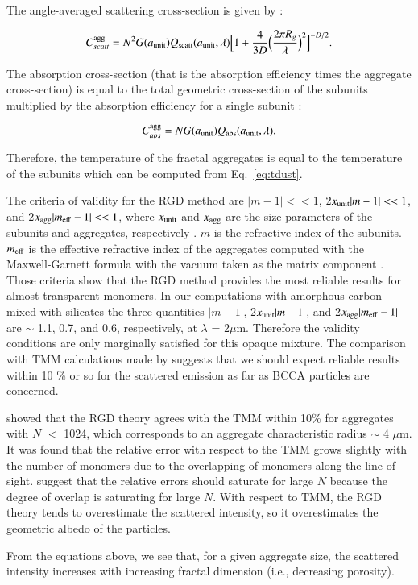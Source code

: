 \documentclass[a4paper,fleqn,usenatbib]{mnras}
\begin{document}
The angle-averaged scattering cross-section is given by \citep{Dobbins1991}:

\begin{equation}
C_{scatt}^{\rm agg} = N^2 G(a_{\rm unit}) Q_{\rm scatt}(a_{\rm unit},\lambda) \Big[1+\frac{4}{3D}\Big(\frac{2\pi R_g}{\lambda}\Big)^2\Big]^{-D/2}.
 \end{equation}

The absorption cross-section (that is the absorption efficiency times the aggregate cross-section) is equal to the total geometric cross-section of the subunits multiplied by the absorption efficiency for a single subunit \citep{Dobbins1991}:

\begin{equation}
C_{abs}^{\rm agg} = N G(a_{\rm unit}) Q_{\rm abs}(a_{\rm unit},\lambda).
 \end{equation}

Therefore, the temperature of the fractal aggregates is equal to the temperature of the subunits which can be computed from Eq.~\ref{eq:tdust}.

The criteria of validity for the RGD method are $\vert m-1\vert << 1$, 2$x_{\rm unit}\vert m-1 \vert << 1$, and 2$x_{\rm agg}\vert m_{\rm eff}-1\vert << 1$, where $x_{\rm unit}$ and $x_{\rm agg}$ are the size parameters of the subunits and aggregates, respectively \citep{Tazaki2016}. $m$ is the refractive index of the subunits. $m_{\rm eff}$ is the effective refractive index of the aggregates computed with the Maxwell-Garnett formula with the vacuum taken as the matrix component \citep{Greenberg1990}. Those criteria show that the RGD method provides the most reliable results for almost transparent monomers.
In our computations with amorphous carbon mixed with silicates the three quantities
$\vert m-1 \vert$, 2$x_{\rm unit}\vert m-1 \vert$, and 2$x_{\rm agg} \vert m_{\rm eff}-1 \vert$ are $\sim$ 1.1, 0.7, and 0.6, respectively, at $\lambda$ = 2$\mu$m. Therefore the validity conditions are only marginally satisfied for this opaque mixture. The comparison with TMM calculations made by \citet{Tazaki2016} suggests that we should expect reliable results within 10 \% or so for the scattered emission as far as BCCA particles are concerned.

\citet{Tazaki2016} showed that the RGD theory agrees with the TMM within 10\% for aggregates with $N$ $<$ 1024, which corresponds to an aggregate characteristic radius $\sim$ 4 $\mu$m. It was found that the relative error with respect to the TMM grows slightly with the number of monomers due to the overlapping of monomers along the line of sight. \citet{Tazaki2016} suggest that the relative errors should saturate for large $N$ because the degree of overlap is saturating for large $N$. With respect to TMM, the RGD theory tends to overestimate the scattered intensity, so it overestimates the geometric albedo of the particles.

From the equations above, we see that, for a given aggregate size, the scattered intensity increases with increasing fractal dimension (i.e., decreasing porosity).




\bsp    %
\label{lastpage}
\end{document}
